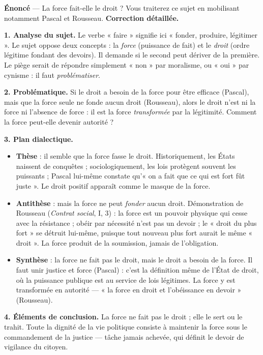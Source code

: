 \documentclass[11pt]{article}
\begin{document}
\begin{exoresolu}
\textbf{Énoncé} — La force fait-elle le droit ? Vous traiterez ce sujet en mobilisant notamment Pascal et Rousseau.
\tcblower
\textbf{Correction détaillée.}

\textbf{1. Analyse du sujet.} Le verbe « faire » signifie ici « fonder, produire, légitimer ». Le sujet oppose deux concepts : la \emph{force} (puissance de fait) et le \emph{droit} (ordre légitime fondant des devoirs). Il demande si le second peut dériver de la première. Le piège serait de répondre simplement « non » par moralisme, ou « oui » par cynisme : il faut \emph{problématiser}.

\textbf{2. Problématique.} Si le droit a besoin de la force pour être efficace (Pascal), mais que la force seule ne fonde aucun droit (Rousseau), alors le droit n'est ni la force ni l'absence de force : il est la force \emph{transformée} par la légitimité. Comment la force peut-elle devenir autorité ?

\textbf{3. Plan dialectique.}
\begin{itemize}
\item \textbf{Thèse} : il semble que la force fasse le droit. Historiquement, les États naissent de conquêtes ; sociologiquement, les lois protègent souvent les puissants ; Pascal lui-même constate qu'« on a fait que ce qui est fort fût juste ». Le droit positif apparaît comme le masque de la force.
\item \textbf{Antithèse} : mais la force ne peut \emph{fonder} aucun droit. Démonstration de Rousseau (\emph{Contrat social}, I, 3) : la force est un pouvoir physique qui cesse avec la résistance ; obéir par nécessité n'est pas un devoir ; le « droit du plus fort » se détruit lui-même, puisque tout nouveau plus fort aurait le même « droit ». La force produit de la soumission, jamais de l'obligation.
\item \textbf{Synthèse} : la force ne fait pas le droit, mais le droit a besoin de la force. Il faut unir justice et force (Pascal) : c'est la définition même de l'État de droit, où la puissance publique est au service de lois légitimes. La force y est transformée en autorité — « la force en droit et l'obéissance en devoir » (Rousseau).
\end{itemize}

\textbf{4. Éléments de conclusion.} La force ne fait pas le droit ; elle le sert ou le trahit. Toute la dignité de la vie politique consiste à maintenir la force sous le commandement de la justice — tâche jamais achevée, qui définit le devoir de vigilance du citoyen.
\end{exoresolu}
\end{document}
